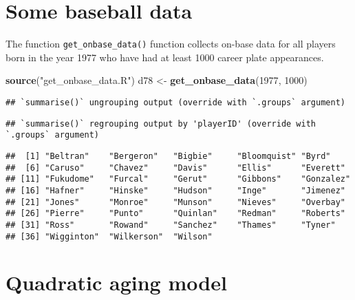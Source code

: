 \documentclass[
]{book}
\newenvironment{Shaded}{\begin{snugshade}}{\end{snugshade}}
\newcommand{\DecValTok}[1]{\textcolor[rgb]{0.00,0.00,0.81}{#1}}
\newcommand{\KeywordTok}[1]{\textcolor[rgb]{0.13,0.29,0.53}{\textbf{#1}}}
\newcommand{\NormalTok}[1]{#1}
\newcommand{\OperatorTok}[1]{\textcolor[rgb]{0.81,0.36,0.00}{\textbf{#1}}}
\newcommand{\StringTok}[1]{\textcolor[rgb]{0.31,0.60,0.02}{#1}}
\begin{document}
\hypertarget{some-baseball-data}{%
\section{Some baseball data}\label{some-baseball-data}}

The function \texttt{get\_onbase\_data()} function collects on-base data for all players born in the year 1977 who have had at least 1000 career plate appearances.

\begin{Shaded}
\begin{Highlighting}[]
\KeywordTok{source}\NormalTok{(}\StringTok{"get_onbase_data.R"}\NormalTok{)}
\NormalTok{d78 <-}\StringTok{ }\KeywordTok{get_onbase_data}\NormalTok{(}\DecValTok{1977}\NormalTok{, }\DecValTok{1000}\NormalTok{)}
\end{Highlighting}
\end{Shaded}

\begin{verbatim}
## `summarise()` ungrouping output (override with `.groups` argument)
\end{verbatim}

\begin{verbatim}
## `summarise()` regrouping output by 'playerID' (override with `.groups` argument)
\end{verbatim}

\begin{Shaded}
\end{Shaded}

\begin{verbatim}
##  [1] "Beltran"    "Bergeron"   "Bigbie"     "Bloomquist" "Byrd"      
##  [6] "Caruso"     "Chavez"     "Davis"      "Ellis"      "Everett"   
## [11] "Fukudome"   "Furcal"     "Gerut"      "Gibbons"    "Gonzalez"  
## [16] "Hafner"     "Hinske"     "Hudson"     "Inge"       "Jimenez"   
## [21] "Jones"      "Monroe"     "Munson"     "Nieves"     "Overbay"   
## [26] "Pierre"     "Punto"      "Quinlan"    "Redman"     "Roberts"   
## [31] "Ross"       "Rowand"     "Sanchez"    "Thames"     "Tyner"     
## [36] "Wigginton"  "Wilkerson"  "Wilson"
\end{verbatim}

\hypertarget{quadratic-aging-model}{%
\section{Quadratic aging model}\label{quadratic-aging-model}}
\end{document}
